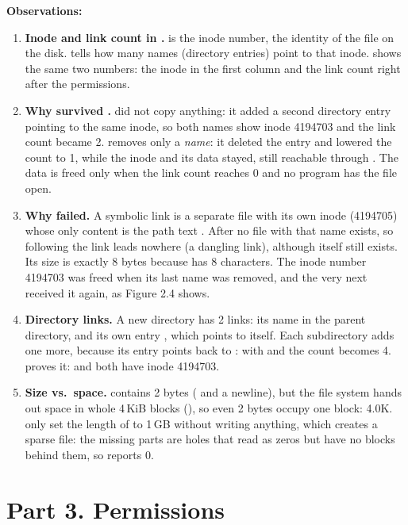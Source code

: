 \documentclass[11pt,a4paper]{article}
\begin{document}
\textbf{Observations:}
\begin{enumerate}
  \item \textbf{Inode and link count in .}  is the inode
  number, the identity of the file on the disk.  tells how many names (directory
  entries) point to that inode.  shows the same two numbers: the inode in the first
  column and the link count right after the permissions.
  \item \textbf{Why  survived .}  did not copy
  anything: it added a second directory entry pointing to the same inode, so both names show
  inode 4194703 and the link count became 2.  removes only a \emph{name}: it deleted the
  entry  and lowered the count to 1, while the inode and its data stayed, still
  reachable through . The data is freed only when the link count reaches 0 and no
  program has the file open.
  \item \textbf{Why  failed.} A symbolic link is a separate file with its own
  inode (4194705) whose only content is the path text . After 
  no file with that name exists, so following the link leads nowhere (a dangling link), although
   itself still exists. Its size is exactly 8 bytes because  has 8
  characters. The inode number 4194703 was freed when its last name was removed, and the very next
   received it again, as Figure 2.4 shows.
  \item \textbf{Directory links.} A new directory has 2 links: its name  in the parent
  directory, and its own entry , which points to itself. Each subdirectory adds one more,
  because its  entry points back to : with  and  the count
  becomes 4.  proves it:  and  both have inode 4194703.
  \item \textbf{Size vs.\ space.}  contains 2 bytes ( and a newline), but
  the file system hands out space in whole 4\,KiB blocks (), so even 2 bytes
  occupy one block: 4.0K.  only set the length of  to 1\,GB
  without writing anything, which creates a sparse file: the missing parts are holes that read
  as zeros but have no blocks behind them, so  reports 0.
\end{enumerate}

\section{Part 3. Permissions}
\end{document}
